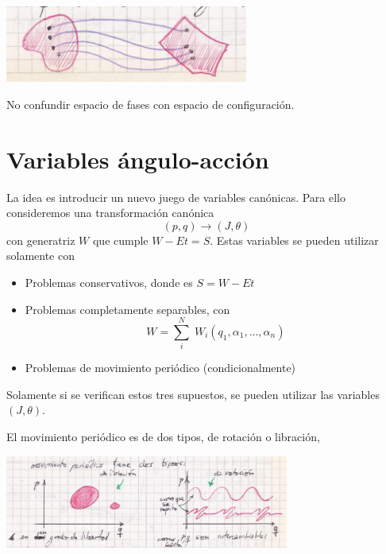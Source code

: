\documentclass[10pt,oneside]{CBFT_book}
\begin{document}
\includegraphics[width=0.6\textwidth]{images/fig_mc_espacio_fases.jpg}	

No confundir espacio de fases con espacio de configuración.

\section{Variables ángulo-acción}

La idea es introducir un nuevo juego de variables canónicas. Para ello consideremos una transformación 
canónica 
\[
	(p, q) \longrightarrow (J, \theta)
\]
con generatriz $W$ que cumple $W-Et=S$. 
Estas variables se pueden utilizar solamente con
\begin{itemize}
	\item Problemas conservativos, donde es $S = W - Et $
	\item Problemas completamente separables, con
	\[
		W = \sum_i^N \; W_i(q_1,\alpha_1,...,\alpha_n)
	\]
	\item Problemas de movimiento periódico (condicionalmente)
\end{itemize}

Solamente si se verifican estos tres supuestos, se pueden utilizar las variables $(J,\theta)$.

El movimiento periódico es de dos tipos, de rotación o libración,

	\includegraphics[width=0.7\textwidth]{images/fig_mc_rot_lib.jpg}	 
\end{document}
